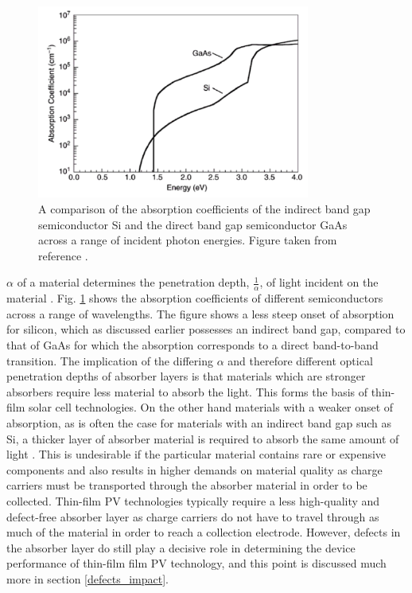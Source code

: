 \documentclass[11pt, twoside]{report}
\begin{document}
\begin{figure}[h!]
  \centering
    \includegraphics[width=0.8\textwidth]{figures/absorption_fig2.png}
    \caption{A comparison of the absorption coefficients of the indirect band gap semiconductor Si and the direct band gap semiconductor GaAs across a range of incident photon energies. Figure taken from reference .}
  \label{absorption_fig2}
\end{figure}

$\alpha$ of a material determines the penetration depth, $\frac{1}{\alpha}$, of light incident on the material \cite{absorption_coeff_book1}. Fig. \ref{absorption_fig2} shows the absorption coefficients of different semiconductors across a range of wavelengths. The figure shows a less steep onset of absorption for silicon, which as discussed earlier possesses an indirect band gap, compared to that of GaAs for which the absorption corresponds to a direct band-to-band transition. 
The implication of the differing $\alpha$ and therefore different optical penetration depths of absorber layers is that materials which are stronger absorbers require less material to absorb the light. This forms the basis of thin-film solar cell technologies.
On the other hand materials with a weaker onset of absorption, as is often the case for materials with an indirect band gap such as Si, a thicker layer of absorber material is required to absorb the same amount of light \cite{PV_bands_book}. This is undesirable if the particular material contains rare or expensive components and also results in higher demands on material quality as charge carriers must be transported through the absorber material in order to be collected.
Thin-film PV technologies typically require a less high-quality and defect-free absorber layer as charge carriers do not have to travel through as much of the material in order to reach a collection electrode. However, defects in the absorber layer do still play a decisive role in determining the device performance of thin-film film PV technology, and this point is discussed much more in section \ref{defects_impact}.
\end{document}
